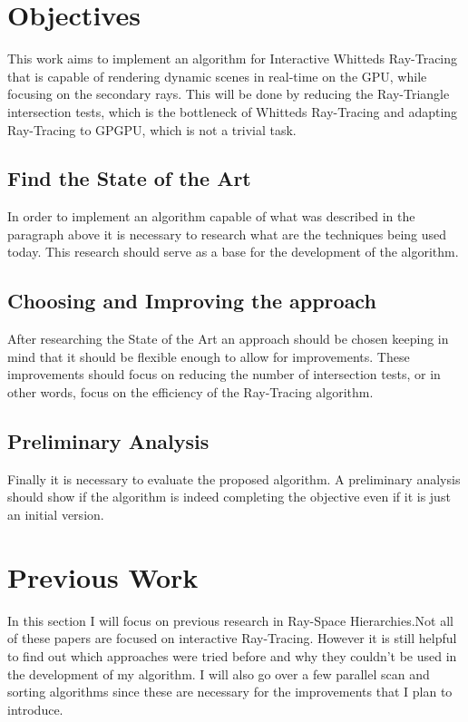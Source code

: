 \documentclass{llncs}
\begin{document}
\newpage

%
\section{Objectives}
%

This work aims to implement an algorithm for Interactive Whitteds Ray-Tracing that is capable of rendering dynamic scenes in real-time on the GPU, while focusing on the secondary rays. This will be done by reducing the Ray-Triangle intersection tests, which is the bottleneck of Whitteds Ray-Tracing and adapting Ray-Tracing to GPGPU, which is not a trivial task.

%
\subsection{Find the State of the Art}
%

In order to implement an algorithm capable of what was described in the paragraph above it is necessary to research what are the techniques being used today. This research should serve as a base for the development of the algorithm.

%
\subsection{Choosing and Improving the approach}
%

After researching the State of the Art an approach should be chosen keeping in mind that it should be flexible enough to allow for improvements. These improvements should focus on reducing the number of intersection tests, or in other words, focus on the efficiency of the Ray-Tracing algorithm.

%
\subsection{Preliminary Analysis}
%

Finally it is necessary to evaluate the proposed algorithm. A preliminary analysis should show if the algorithm is indeed completing the objective even if it is just an initial version.

\newpage

%
\section{Previous Work}
%

In this section I will focus on previous research in Ray-Space Hierarchies.Not all of these papers are focused on interactive Ray-Tracing. However it is still helpful to find out which approaches were tried before and why they couldn't be used in the development of my algorithm. I will also go over a few parallel scan and sorting algorithms since these are necessary for the improvements that I plan to introduce.
\end{document}
